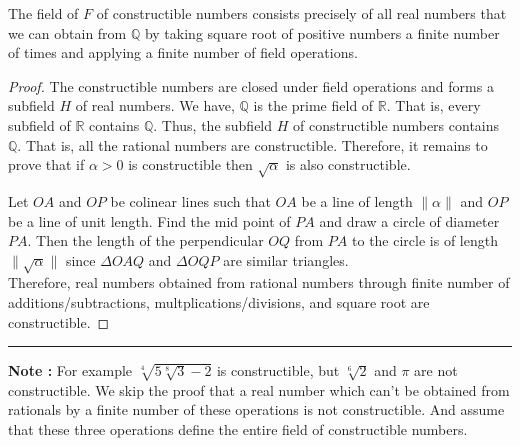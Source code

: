 \begin{theorem}
	The field of $F$ of constructible numbers consists {\color{blue}precisely} of all real numbers that we can obtain from $\mathbb{Q}$ by taking square root of positive numbers a finite number of times and applying a finite number of field operations.
\end{theorem}
\begin{proof}
	The constructible numbers are closed under field operations and forms a subfield $H$ of real numbers.
	We have, $\mathbb{Q}$ is the prime field of $\mathbb{R}$.
	That is, every subfield of $\mathbb{R}$ contains $\mathbb{Q}$.
	Thus, the subfield $H$ of constructible numbers contains $\mathbb{Q}$.
	That is, all the rational numbers are constructible.
	Therefore, it remains to prove that if $\alpha > 0$ is constructible then $\sqrt{\alpha}$ is also constructible.
\begin{center}
\end{center}

	Let $OA$ and $OP$ be colinear lines such that $OA$ be a line of length $\| \alpha \|$ and $OP$ be a line of unit length.
	Find the mid point of $PA$ and draw a circle of diameter $PA$.
	Then the length of the perpendicular $OQ$ from $PA$ to the circle is of length $\| \sqrt{\alpha} \|$ since $\Delta OAQ$ and $\Delta OQP$ are similar triangles.\\


	Therefore, real numbers obtained from rational numbers through finite number of additions/subtractions, multplications/divisions, and square root are constructible.
\end{proof}
\hrule\vspace{1em}
\textbf{Note : } For example $\sqrt[4]{5\sqrt[8]{3}-2}$ is constructible, but $\sqrt[6]{2}$ and $\pi$ are not constructible.
We skip the proof that a real number which can't be obtained from rationals by a finite number of these operations is not constructible.
And assume that these three operations define the entire field of constructible numbers.
